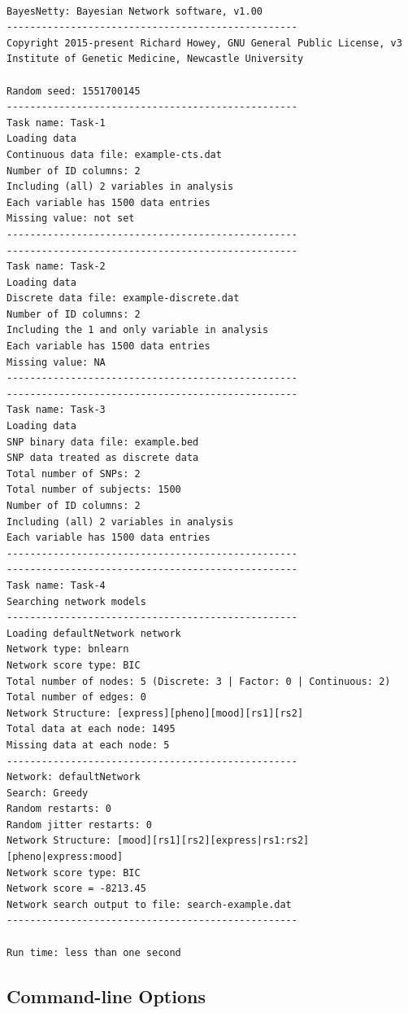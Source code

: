 \documentclass[a4paper,12pt]{article}
\begin{document}
\vspace{0.35cm} \begin{lstlisting}

BayesNetty: Bayesian Network software, v1.00
--------------------------------------------------
Copyright 2015-present Richard Howey, GNU General Public License, v3
Institute of Genetic Medicine, Newcastle University

Random seed: 1551700145
--------------------------------------------------
Task name: Task-1
Loading data
Continuous data file: example-cts.dat
Number of ID columns: 2
Including (all) 2 variables in analysis
Each variable has 1500 data entries
Missing value: not set
--------------------------------------------------
--------------------------------------------------
Task name: Task-2
Loading data
Discrete data file: example-discrete.dat
Number of ID columns: 2
Including the 1 and only variable in analysis
Each variable has 1500 data entries
Missing value: NA
--------------------------------------------------
--------------------------------------------------
Task name: Task-3
Loading data
SNP binary data file: example.bed
SNP data treated as discrete data
Total number of SNPs: 2
Total number of subjects: 1500
Number of ID columns: 2
Including (all) 2 variables in analysis
Each variable has 1500 data entries
--------------------------------------------------
--------------------------------------------------
Task name: Task-4
Searching network models
--------------------------------------------------
Loading defaultNetwork network
Network type: bnlearn
Network score type: BIC
Total number of nodes: 5 (Discrete: 3 | Factor: 0 | Continuous: 2)
Total number of edges: 0
Network Structure: [express][pheno][mood][rs1][rs2]
Total data at each node: 1495
Missing data at each node: 5
--------------------------------------------------
Network: defaultNetwork
Search: Greedy
Random restarts: 0
Random jitter restarts: 0
Network Structure: [mood][rs1][rs2][express|rs1:rs2][pheno|express:mood]
Network score type: BIC
Network score = -8213.45
Network search output to file: search-example.dat
--------------------------------------------------

Run time: less than one second

\end{lstlisting} \vspace{0.35cm}

\subsection{Command-line Options}
\label{command-line}
\end{document}
